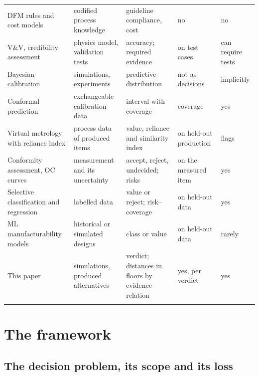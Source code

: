 \documentclass[pdflatex,sn-basic,lineno]{sn-jnl}
\providecommand{\DIFaddbegin}{} %
\providecommand{\DIFaddend}{} %
\providecommand{\DIFdelbegin}{} %
\providecommand{\DIFdelend}{} %
\providecommand{\DIFaddendFL}{} %
\newcommand{\DIFscaledelfig}{0.5}
\newlength{\DIFdelgraphicswidth} %
\newlength{\DIFdelgraphicsheight} %
\newcommand{\DIFaddincludegraphics}[2][]{{\color{blue}\fbox{\DIFOincludegraphics[#1]{#2}}}} %
\newcommand{\DIFdelincludegraphics}[2][]{%
\sbox{\DIFdelgraphicsbox}{\DIFOincludegraphics[#1]{#2}}%
\settoboxwidth{\DIFdelgraphicswidth}{\DIFdelgraphicsbox} %
\settoboxtotalheight{\DIFdelgraphicsheight}{\DIFdelgraphicsbox} %
\scalebox{\DIFscaledelfig}{%
\parbox[b]{\DIFdelgraphicswidth}{\usebox{\DIFdelgraphicsbox}\\[-\baselineskip] \rule{\DIFdelgraphicswidth}{0em}}\llap{\resizebox{\DIFdelgraphicswidth}{\DIFdelgraphicsheight}{%
\setlength{\unitlength}{\DIFdelgraphicswidth}%
\begin{picture}(1,1)%
\thicklines\linethickness{2pt} %
{\color[rgb]{1,0,0}\put(0,0){\framebox(1,1){}}}%
{\color[rgb]{1,0,0}\put(0,0){\line( 1,1){1}}}%
{\color[rgb]{1,0,0}\put(0,1){\line(1,-1){1}}}%
\end{picture}%
}\hspace*{3pt}}} %
} %
\DeclareRobustCommand{\DIFaddbegin}{\DIFOaddbegin \let\includegraphics\DIFaddincludegraphics} %
\DeclareRobustCommand{\DIFaddend}{\DIFOaddend \let\includegraphics\DIFOincludegraphics} %
\DeclareRobustCommand{\DIFdelbegin}{\DIFOdelbegin \let\includegraphics\DIFdelincludegraphics} %
\DeclareRobustCommand{\DIFdelend}{\DIFOaddend \let\includegraphics\DIFOincludegraphics} %
\DeclareRobustCommand{\DIFaddendFL}{\DIFOaddendFL \let\includegraphics\DIFOincludegraphics} %
\begin{document}
\begin{table}[t]
\begin{tabular}{@{}L{3.2cm}L{2.5cm}L{2.9cm}L{1.9cm}L{1.5cm}@{}}
\midrule
DFM rules and cost models \citep{boothroyd2010product} & codified process knowledge & guideline compliance, cost & no & no \\
V\&V, credibility assessment \citep{oberkampf2010verification, asme2018assessing} & physics model, validation tests & accuracy; required evidence & on test cases & can require tests \\
Bayesian calibration \citep{kennedy2001bayesian} & simulations, experiments & predictive distribution & not as decisions & implicitly \\
Conformal prediction \citep{lei2018distribution} & exchangeable calibration data & interval with coverage & coverage & yes \\
Virtual metrology with reliance index \citep{cheng2008evaluating} & process data of produced items & value, reliance and similarity index & on held-out production & flags \\
Conformity assessment, OC curves \citep{iso2017decision, bechhofer1954single} & measurement and its uncertainty & accept, reject, undecided; risks & on the measured item & yes \\
Selective classification and regression \citep{chow1970optimum, zaoui2020regression} & labelled data & value or reject; risk--coverage & on held-out data & yes \\
ML manufacturability models \citep{ghadai2018learning, yan2026machine} & historical or simulated designs & class or value & on held-out data & rarely \\
This paper & simulations, produced alternatives & verdict; distances in floors by evidence relation & yes, per verdict & yes \\
\botrule
\end{tabular}
\DIFaddendFL \end{table}

\section{The framework}\label{sec:method}

\DIFdelbegin %
\DIFdelend \DIFaddbegin \subsection{The decision problem, its scope and its loss}\DIFaddend \label{sec:problem}
\end{document}
